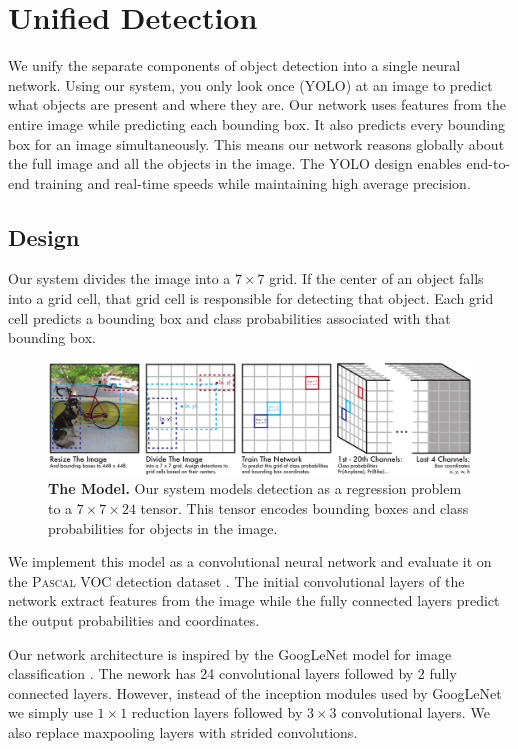 \documentclass{article} %
\begin{document}
\section{Unified Detection}

We unify the separate components of object detection into a single neural network. Using our system, you only look once (YOLO) at an image to predict what objects are present and where they are. Our network uses features from the entire image while predicting each bounding box. It also predicts every bounding box for an image simultaneously. This means our network reasons globally about the full image and all the objects in the image. The YOLO design enables end-to-end training and real-time speeds while maintaining high average precision.

\subsection{Design}

Our system divides the image into a $7 \times 7$ grid. If the center of an object falls into a grid cell, that grid cell is responsible for detecting that object. Each grid cell predicts a bounding box and class probabilities associated with that bounding box.

\begin{figure}[h]
\begin{center}
        \includegraphics[width=\linewidth]{full}
\end{center}
   \caption{\textbf{The Model.} Our system models detection as a regression problem to a $7 \times 7 \times 24$ tensor. This tensor encodes bounding boxes and class probabilities for objects in the image.}
\label{model}
\end{figure}

We implement this model as a convolutional neural network and evaluate it on the \textsc{Pascal} VOC detection dataset \cite{Everingham15}. The initial convolutional layers of the network extract features from the image while the fully connected layers predict the output probabilities and coordinates.

Our network architecture is inspired by the GoogLeNet model for image classification \cite{DBLP:journals/corr/SzegedyLJSRAEVR14}. The nework has 24 convolutional layers followed by 2 fully connected layers. However, instead of the inception modules used by GoogLeNet we simply use $1 \times 1$ reduction layers followed by $3 \times 3$ convolutional layers. We also replace maxpooling layers with strided convolutions.
\end{document}
